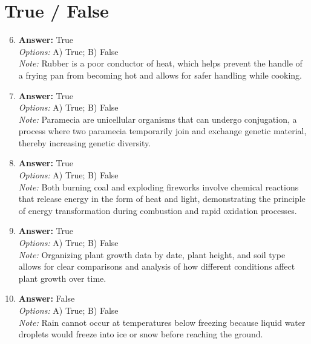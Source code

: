 \documentclass[12pt]{article}
\begin{document}
\section*{True / False}
\begin{enumerate}[label=\arabic*.]
\setcounter{enumi}{5}
\item \textbf{Answer:} True
\\ \textit{Options:} A) True; B) False
\\ \textit{Note:} Rubber is a poor conductor of heat, which helps prevent the handle of a frying pan from becoming hot and allows for safer handling while cooking.
\item \textbf{Answer:} True
\\ \textit{Options:} A) True; B) False
\\ \textit{Note:} Paramecia are unicellular organisms that can undergo conjugation, a process where two paramecia temporarily join and exchange genetic material, thereby increasing genetic diversity.
\item \textbf{Answer:} True
\\ \textit{Options:} A) True; B) False
\\ \textit{Note:} Both burning coal and exploding fireworks involve chemical reactions that release energy in the form of heat and light, demonstrating the principle of energy transformation during combustion and rapid oxidation processes.
\item \textbf{Answer:} True
\\ \textit{Options:} A) True; B) False
\\ \textit{Note:} Organizing plant growth data by date, plant height, and soil type allows for clear comparisons and analysis of how different conditions affect plant growth over time.
\item \textbf{Answer:} False
\\ \textit{Options:} A) True; B) False
\\ \textit{Note:} Rain cannot occur at temperatures below freezing because liquid water droplets would freeze into ice or snow before reaching the ground.
\end{enumerate}
\end{document}
